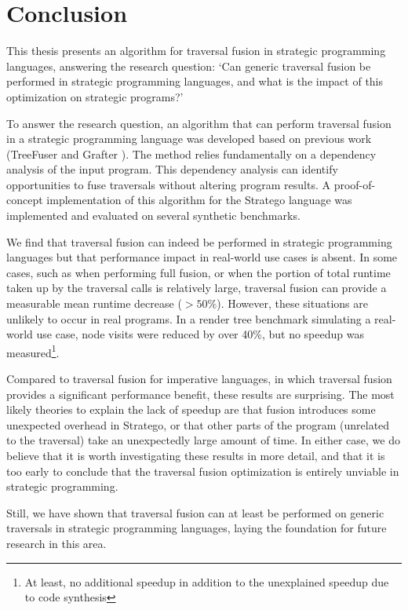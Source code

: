 \chapter{\label{chap:conclusion}Conclusion}

This thesis presents an algorithm for traversal fusion in strategic programming languages, answering the research question: `Can generic traversal fusion be performed in strategic programming languages, and what is the impact of this optimization on strategic programs?'

To answer the research question, an algorithm that can perform traversal fusion in a strategic programming language was developed based on previous work (TreeFuser and Grafter \cite{SakkaS017, SakkaSN019}). The method relies fundamentally on a dependency analysis of the input program. This dependency analysis can identify opportunities to fuse traversals without altering program results. A proof-of-concept implementation of this algorithm for the Stratego language was implemented and evaluated on several synthetic benchmarks.

We find that traversal fusion can indeed be performed in strategic programming languages but that performance impact in real-world use cases is absent. In some cases, such as when performing full fusion, or when the portion of total runtime taken up by the traversal calls is relatively large, traversal fusion can provide a measurable mean runtime decrease ($>50\%$). However, these situations are unlikely to occur in real programs. In a render tree benchmark simulating a real-world use case, node visits were reduced by over 40\%, but no speedup was measured\footnote{At least, no additional speedup in addition to the unexplained speedup due to code synthesis}.

Compared to traversal fusion for imperative languages, in which traversal fusion provides a significant performance benefit, these results are surprising. The most likely theories to explain the lack of speedup are that fusion introduces some unexpected overhead in Stratego, or that other parts of the program (unrelated to the traversal) take an unexpectedly large amount of time. In either case, we do believe that it is worth investigating these results in more detail, and that it is too early to conclude that the traversal fusion optimization is entirely unviable in strategic programming.

Still, we have shown that traversal fusion can at least be performed on generic traversals in strategic programming languages, laying the foundation for future research in this area.

